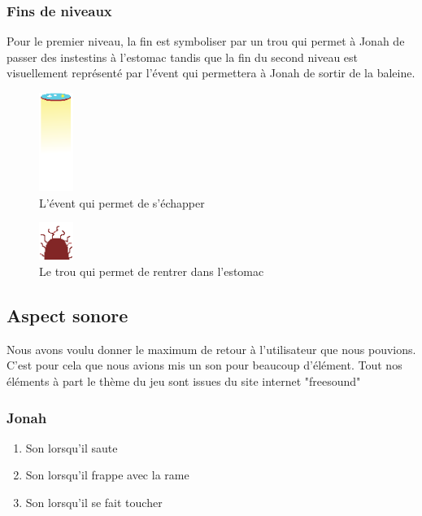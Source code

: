 \documentclass{prologArticle}
\begin{document}
\subsubsection{Fins de niveaux}

Pour le premier niveau, la fin est symboliser par un trou qui permet à Jonah de passer des instestins à l'estomac tandis que la fin du second niveau est visuellement représenté par l'évent qui permettera à Jonah de sortir de la baleine.

\begin{figure}[H]
    \centering
    \includegraphics[width=0.1\textwidth]{res/ovent.png}
    \caption{L'évent qui permet de s'échapper}
\end{figure}

\begin{figure}[H]
    \centering
    \includegraphics[width=0.1\textwidth]{res/door.png}
    \caption{Le trou qui permet de rentrer dans l'estomac}
\end{figure}

\subsection{Aspect sonore}
Nous avons voulu donner le maximum de retour à l'utilisateur que nous pouvions. C'est pour cela que nous avions mis un son pour beaucoup d'élément. Tout nos éléments à part le thème du jeu sont issues du site internet "freesound"

\subsubsection{Jonah}
\begin{enumerate}
    \item Son lorsqu'il saute
    \item Son lorsqu'il frappe avec la rame
    \item Son lorsqu'il se fait toucher
\end{enumerate}
\end{document}
